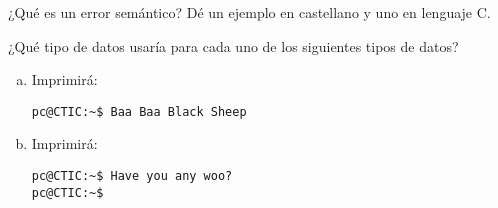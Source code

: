 \documentclass[spanish,addpoints,answers,a4paper]{exam}
\begin{document}
\begin{questions}

\question ¿Qué es un error semántico? Dé un ejemplo en castellano y uno en lenguaje C.

\begin{solution}


\end{solution}

\question ¿Qué tipo de datos usaría para cada uno de los siguientes tipos de datos?

\begin{solution}
\begin{multicols}{2}
\begin{enumerate}[(a)]

\item Imprimirá:

\begin{verbatim}
pc@CTIC:~$ Baa Baa Black Sheep
\end{verbatim}

\item Imprimirá:

\begin{verbatim}
pc@CTIC:~$ Have you any woo?
pc@CTIC:~$ 
\end{verbatim}

\end{enumerate}
\end{multicols}
\end{solution}


\end{questions}
\end{document}
